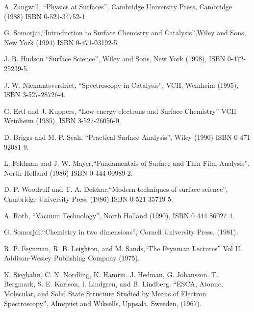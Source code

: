 \documentclass[12pt]{book}
\begin{document}
\begin{thebibliography}{99}

 A. Zangwill, ``Physics at Surfaces'', Cambridge University Press, Cambridge (1988) ISBN 0-521-34752-1.

 G. Somorjai,``Introduction to Surface Chemistry and Catalysis'',Wiley and Sons, New York (1994) ISBN 0-471-03192-5.

 J. B. Hudson ``Surface Science'', Wiley and Sons, New York (1998), ISBN 0-472-25239-5.

 J. W. Niemantsverdriet, ``Spectroscopy in Catalysis'', VCH, Weinheim (1995), ISBN 3-527-28726-4.

 G. Ertl and J. Kuppers, ``Low energy electrons and Surface Chemistry'' VCH Weinheim (1985), ISBN 3-527-26056-0.

           D. Briggs and M. P. Seah, ``Practical
          Surface Analysis'', Wiley (1990) ISBN 0 471 92081 9.

             L. Feldman and J. W.
          Mayer,``Fundamentals of Surface and Thin Film Analysis'',
          North-Holland (1986) ISBN 0 444 00989 2.


              D. P. Woodruff and T. A.
          Delchar,``Modern techniques of surface science'', Cambridge
          University Press (1986) ISBN 0 521 35719 5.




           A. Roth, ``Vacuum Technology'', North Holland
          (1990), ISBN 0 444 86027 4.

	 G. Somorjai,``Chemistry in two dimensions'', Cornell University Press, (1981).

              R. P. Feynman, R. B. Leighton, and M.
          Sands,``The Feynman Lectures'' Vol II. Addison-Wesley
          Publishing Company (1975).



               K.  Siegbahn,  C.  N.  Nordling,   K.
          Hamrin, J. Hedman, G. Johansson, T. Bergmark, S. E. Karlson,
          I. Lindgren, and B. Lindberg. ``ESCA, Atomic, Molecular, and
          Solid  State  Structure  Studied  by   Means   of   Electron
          Spectroscopy'', Almqvist and Wiksells, Uppsala, Sweeden, (1967).




\end{thebibliography}
\end{document}
